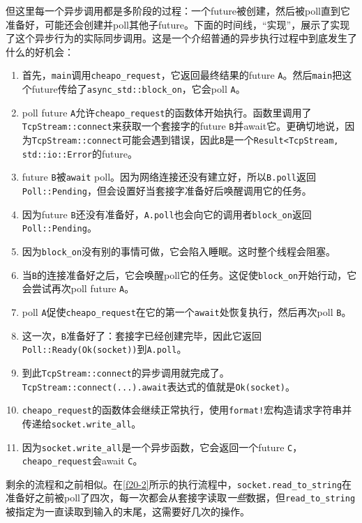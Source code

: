 但这里每一个异步调用都是多阶段的过程：一个future被创建，然后被poll直到它准备好，可能还会创建并poll其他子future。下面的时间线，“实现”，展示了实现了这个异步行为的实际同步调用。这是一个介绍普通的异步执行过程中到底发生了什么的好机会：
\begin{enumerate}
    \item 首先，\texttt{main}调用\texttt{cheapo\_request}，它返回最终结果的future \texttt{A}。然后\texttt{main}把这个future传给了\texttt{async\_std::block\_on}，它会poll \texttt{A}。
    \item poll future \texttt{A}允许\texttt{cheapo\_request}的函数体开始执行。函数里调用了\texttt{TcpStream::connect}来获取一个套接字的future \texttt{B}并await它。更确切地说，因为\texttt{TcpStream::connect}可能会遇到错误，因此\texttt{B}是一个\texttt{Result<TcpStream, std::io::Error}的future。
    \item future \texttt{B}被\texttt{await} poll。因为网络连接还没有建立好，所以\texttt{B.poll}返回\texttt{Poll::Pending}，但会设置好当套接字准备好后唤醒调用它的任务。
    \item 因为future \texttt{B}还没有准备好，\texttt{A.poll}也会向它的调用者\texttt{block\_on}返回\texttt{Poll::Pending}。
    \item 因为\texttt{block\_on}没有别的事情可做，它会陷入睡眠。这时整个线程会阻塞。
    \item 当\texttt{B}的连接准备好之后，它会唤醒poll它的任务。这促使\texttt{block\_on}开始行动，它会尝试再次poll future \texttt{A}。
    \item poll \texttt{A}促使\texttt{cheapo\_request}在它的第一个\texttt{await}处恢复执行，然后再次poll \texttt{B}。
    \item 这一次，\texttt{B}准备好了：套接字已经创建完毕，因此它返回\texttt{Poll::Ready(Ok(socket))}到\texttt{A.poll}。
    \item 到此\texttt{TcpStream::connect}的异步调用就完成了。\texttt{TcpStream::connect(...).await}表达式的值就是\texttt{Ok(socket)}。
    \item \texttt{cheapo\_request}的函数体会继续正常执行，使用\texttt{format!}宏构造请求字符串并传递给\texttt{socket.write\_all}。
    \item 因为\texttt{socket.write\_all}是一个异步函数，它会返回一个future \texttt{C}，\texttt{cheapo\_request}会await \texttt{C}。
\end{enumerate}

剩余的流程和之前相似。在\autoref{f20-2}所示的执行流程中，\texttt{socket.read\_to\_string}在准备好之前被poll了四次，每一次都会从套接字读取\emph{一些}数据，但\texttt{read\_to\_string}被指定为一直读取到输入的末尾，这需要好几次的操作。

